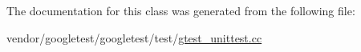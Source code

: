 The documentation for this class was generated from the following file\+:\begin{DoxyCompactItemize}
\item 
vendor/googletest/googletest/test/\hyperlink{gtest__unittest_8cc}{gtest\+\_\+unittest.\+cc}\end{DoxyCompactItemize}
